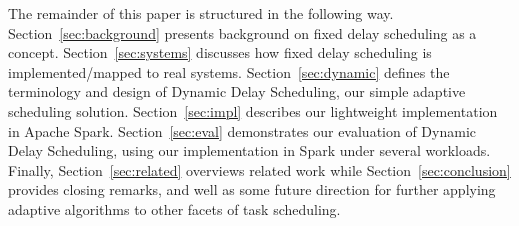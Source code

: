 The remainder of this paper is structured in the following way. Section~\ref{sec:background}
presents background on fixed delay scheduling as a concept. Section~\ref{sec:systems} discusses how fixed delay
scheduling is implemented/mapped to real systems. Section~\ref{sec:dynamic} defines the terminology and
design of Dynamic Delay Scheduling, our simple adaptive scheduling solution. Section~\ref{sec:impl} describes our
lightweight implementation in Apache Spark. Section~\ref{sec:eval} demonstrates our evaluation of Dynamic
Delay Scheduling, using our implementation in Spark under several workloads. Finally,
Section~\ref{sec:related} overviews related work while
Section~\ref{sec:conclusion} provides closing remarks, and well as some future direction for further
applying adaptive algorithms to other facets of task scheduling.

